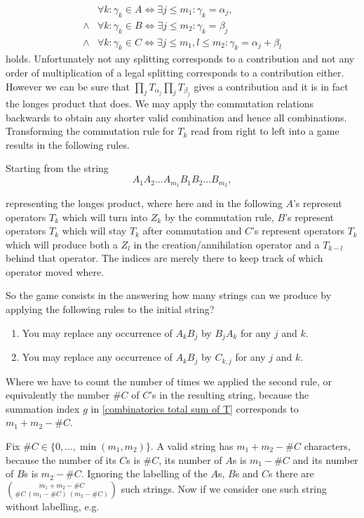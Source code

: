 \documentclass[b5paper,draft,openbib,12pt]{memoir}
\begin{document}
\begin{align*}
&\forall k: \gamma_k \in A \iff \exists j\le m_1: \gamma_k = \alpha_j, \\
\wedge& \forall k: \gamma_k \in B \iff \exists j\le m_2: \gamma_k = \beta_j\\
\wedge & \forall k: \gamma_k \in C \iff \exists j\le m_1, l\le m_2: \gamma_k = \alpha_j + \beta_l
\end{align*}
 holds. Unfortunately not any splitting corresponds to a contribution and not any
 order of multiplication of a legal splitting corresponds to a contribution either.
 However we can be sure that \(\prod_{j} T_{\alpha_j} \prod_j T_{\beta_j}\) gives
 a contribution and it is in fact the longes product that does.
 We may apply the commutation relations backwards to obtain any
 shorter valid combination and hence all combinations. 
 Transforming the commutation rule for \(T_k\) read from right to left
 into a game results in the following rules.
 
Starting from the string 
\begin{equation}
A_1A_2\dots A_{m_1} B_1 B_2 \dots B_{m_2},
\end{equation}

representing the longes product, where here and in the following \(A\)'s
represent operators \(T_k\) which will turn into \(Z_k\) by the commutation rule,
\(B\)'s represent operators \(T_k\) which will stay \(T_k\) after commutation and
\(C\)'s represent operators \(T_k\) which will produce both a \(Z_l\) in the creation/annihilation
operator and a \(T_{k-l}\) behind that operator. The indices are merely there to keep track of
which operator moved where.

So the game consists in the answering how many strings can we produce by 
applying the following rules to the initial string?
\begin{enumerate}
\item You may replace any occurrence of \(A_k B_j\) by \(B_j A_k\) for any \(j\) and \(k\).
\item You may replace any occurrence of \(A_k B_j\) by \(C_{k,j}\) for any \(j\) and \(k\).
\end{enumerate}
Where we have to count the number of times we applied the second rule, or equivalently
the number \(\#C\) of \(C\)'s in the resulting string, because the summation index \(g\) in 
\eqref{combinatorics total sum of T} corresponds to \(m_1+m_2-\#C\). 

Fix \(\#C \in\{0,\dots ,\min(m_1,m_2)\}\). A valid string has \(m_1+m_2-\#C\) characters,
because the number of its \(C\)s is \(\#C\), its number of \(A\)s is \(m_1-\#C\) and 
its number of \(B\)s is \(m_2-\#C\). Ignoring the labelling of the \(A\)s, \(B\)s and \(C\)s 
there are \(\binom{m_1+m_2-\#C}{\#C \ (m_1 - \#C) \ (m_2-\#C)}\) such strings. Now if
we consider one such string without labelling, e.g.
\end{document}
